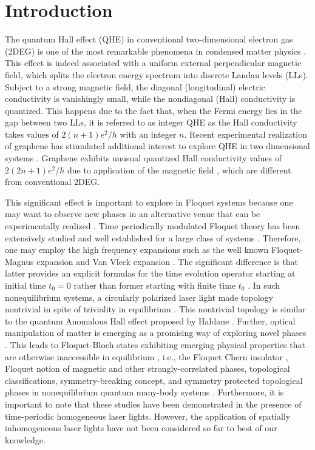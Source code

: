 \section{Introduction}

The quantum Hall effect (QHE) in conventional two-dimensional electron gas (2DEG) is one of the most remarkable phenomena in condensed matter physics \cite{QHE1}. This effect is indeed associated with a uniform external perpendicular magnetic field, which splits the electron energy spectrum into discrete Landau levels (LLs). Subject to a strong magnetic field, the diagonal (longitudinal) electric conductivity is vanishingly small, while the nondiagonal (Hall) conductivity is quantized. This happens due to the fact that, when the Fermi energy lies in the gap between two LLs, it is referred to as integer QHE as the Hall conductivity takes values of $2(n + 1)e^2/h$ with an integer $n$. Recent experimental realization of graphene has stimulated additional interest to explore QHE in two dimensional systems \cite{QHE2, QHE3, QHE4}. Graphene exhibits unusual quantized Hall conductivity values of $2(2n + 1)e^2/h$ due to application of the magnetic field \cite{QHE4}, which are different from conventional 2DEG.

This significant effect is important to explore in Floquet systems \cite{NHL, AEE} because one may want to observe new phases in an alternative venue that can be experimentally realized \cite{MCR, YHW, HZJ, JWM}. Time periodically modulated Floquet theory has been extensively studied and well established for a large class of systems \cite{JHS,HSA,MGP,MBL,AEE,NGJ}. Therefore, one may employ the high frequency expansions \cite{MBL,AEE,NGJ,SRI,API,TMS,ESM,TKT,ALA} such as the well known Floquet-Magnus expansion \cite{ESM,TKT,ALA,FCA} and Van Vleck expansion \cite{MBL,AEE}. The significant difference is that latter provides an explicit formulas for the time evolution operator starting at initial time $t_{0}=0$ rather than former starting with finite time $t_{0}$ \cite{supp}. In such nonequilibrium systems, a circularly polarized laser light made topology nontrivial in spite of triviality in equilibrium \cite{TKO}. This nontrivial topology is similar to the quantum Anomalous Hall effect proposed by Haldane \cite{Haldane}. Further, optical manipulation of matter is emerging as a promising way of exploring novel phases \cite{AKA, JHM}. This leads to Floquet-Bloch states exhibiting emerging physical properties that are otherwise inaccessible in equilibrium \cite{LST}, i.e., the Floquet Chern insulator \cite{AGG}, Floquet notion of magnetic and other strongly-correlated phases\cite{MSR}, topological classifications, symmetry-breaking concept, and symmetry protected topological phases in nonequilibrium quantum many-body systems \cite{EKM, MSR}. Furthermore, it is important to note that these studies have been demonstrated in the presence of time-periodic homogeneous laser lights. However, the application of spatially inhomogeneous \cite{SWP1, SWP2, SWP3, SWP4, SWP5} laser lights have not been considered so far to best of our knowledge.

